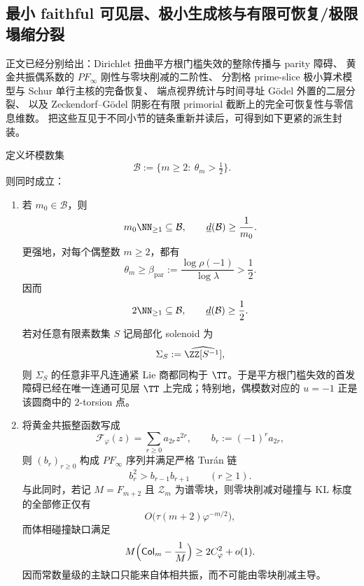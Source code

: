 \subsection{最小 faithful 可见层、极小生成核与有限可恢复/极限塌缩分裂}

正文已经分别给出：Dirichlet 扭曲平方根门槛失效的整除传播与 parity 障碍、
黄金共振偶系数的 \(PF_\infty\) 刚性与零块削减的二阶性、
分割格 prime-slice 极小算术模型与 Schur 单行主核的完备恢复、
端点视界统计与时间寻址 Gödel 外置的二层分裂、
以及 Zeckendorf--Gödel 阴影在有限 primorial 截断上的完全可恢复性与零信息维数。
把这些互见于不同小节的链条重新并读后，可得到如下更紧的派生封装。

\begin{theorem}\label{thm:derived-visible-minimal-layer-threshold-failure-bulk-resonance}
定义坏模数集
\[
\mathcal B:=\{m\ge 2:\ \theta_m>\tfrac12\}.
\]
则同时成立：
\begin{enumerate}
\normalfont
  \item 若 \(m_0\in\mathcal B\)，则
  \[
  m_0\NN_{\ge 1}\subseteq \mathcal B,
  \qquad
  \underline d(\mathcal B)\ge \frac1{m_0}.
  \]
  更强地，对每个偶整数 \(m\ge 2\)，都有
  \[
  \theta_m\ge \beta_{\mathrm{par}}
  :=
  \frac{\log \rho(-1)}{\log \lambda}
  >
  \frac12.
  \]
  因而
  \[
  2\NN_{\ge 1}\subseteq \mathcal B,
  \qquad
  \underline d(\mathcal B)\ge \frac12.
  \]
  若对任意有限素数集 \(S\) 记局部化 solenoid 为
  \[
  \Sigma_S:=\widehat{\ZZ[S^{-1}]},
  \]
  则 \(\Sigma_S\) 的任意非平凡连通紧 Lie 商都同构于 \(\TT\)。于是平方根门槛失效的首发障碍已经在唯一连通可见层 \(\TT\) 上完成；特别地，偶模数对应的 \(u=-1\) 正是该圆商中的 \(2\)-torsion 点。
  \item 将黄金共振整函数写成
  \[
  \mathcal F_\varphi(z)=\sum_{r\ge 0}a_{2r}z^{2r},
  \qquad
  b_r:=(-1)^r a_{2r},
  \]
  则 \((b_r)_{r\ge 0}\) 构成 \(PF_\infty\) 序列并满足严格 Tur\'an 链
  \[
  b_r^2>b_{r-1}b_{r+1}
  \qquad (r\ge 1).
  \]
  与此同时，若记 \(M=F_{m+2}\) 且 \(\mathcal Z_m\) 为谱零块，则零块削减对碰撞与 \(\mathrm{KL}\) 标度的全部修正仅有
  \[
  O\!\bigl(\tau(m+2)\varphi^{-m/2}\bigr),
  \]
  而体相碰撞缺口满足
  \[
  M\Bigl(\mathsf{Col}_m-\frac1M\Bigr)\ge 2C_\varphi^2+o(1).
  \]
  因而常数量级的主缺口只能来自体相共振，而不可能由零块削减主导。
\end{enumerate}
\end{theorem}

